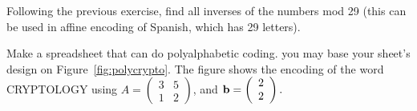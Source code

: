 \begin{exercise}{}
Following the previous exercise, find all inverses of the numbers mod 29 (this can be used in affine encoding of Spanish, which has 29 letters).
\end{exercise}

\begin{exercise}{}
Make a spreadsheet that can do polyalphabetic coding.  you may base your sheet's design on Figure~\ref{fig:polycrypto}. The figure shows the encoding of the word CRYPTOLOGY using 
$A = \left(
\begin{array}{cc}
3 & 5 \\
1 & 2
\end{array}
\right)$, and ${\bold b} = \left( \begin{array}{c} 2 \\ 2 \end{array}\right).$ 


\end{exercise}
